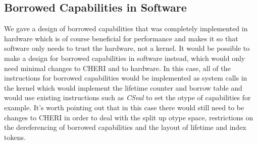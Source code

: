 \subsection{Borrowed Capabilities in Software}
We gave a design of borrowed capabilities that was completely implemented in hardware which is of course beneficial for performance and makes it so that software only needs to trust the hardware, not a kernel.
It would be possible to make a design for borrowed capabilities in software instead, which would only need minimal changes to CHERI and to hardware.
In this case, all of the instructions for borrowed capabilities would be implemented as system calls in the kernel which would implement the lifetime counter and borrow table and would use existing instructions such as \textit{CSeal} to set the otype of capabilities for example.
It's worth pointing out that in this case there would still need to be changes to CHERI in order to deal with the split up otype space, restrictions on the dereferencing of borrowed capabilities and the layout of lifetime and index tokens.
